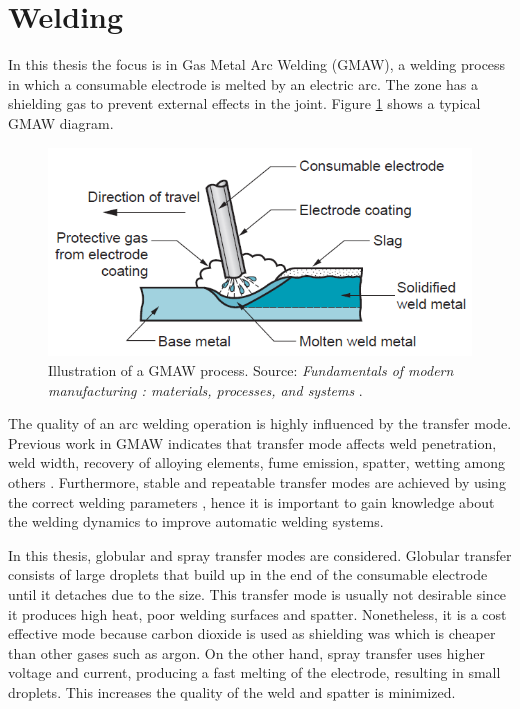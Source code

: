 \section{Welding}
In this thesis the focus is in Gas Metal Arc Welding (GMAW), a welding process in which a consumable electrode is melted by an electric arc. The zone has a shielding gas to prevent external effects in the joint. Figure \ref{fig:gmaw} shows a typical GMAW diagram.

\begin{figure}
    \centering
    \includegraphics{Images/Background/gmaw.png}
    \caption[Illustration of a GMAW process]{Illustration of a GMAW process. Source: \textit{Fundamentals of modern manufacturing : materials, processes, and systems} \cite{grover}.}
    \label{fig:gmaw}
\end{figure}

The quality of an arc welding operation is highly influenced by the transfer mode. Previous work in GMAW indicates that transfer mode affects weld penetration, weld width, recovery of alloying elements, fume emission, spatter, wetting among others \cite{lancaster, mendez2015}. Furthermore, stable and repeatable transfer modes are achieved by using the correct welding parameters \cite{zhang2}, hence it is important to gain knowledge about the welding dynamics to improve automatic welding systems.

In this thesis, globular and spray transfer modes are considered. Globular transfer consists of large droplets that build up in the end of the consumable electrode until it detaches due to the size. This transfer mode is usually not desirable since it produces high heat, poor welding surfaces and spatter. Nonetheless, it is a cost effective mode because carbon dioxide is used as shielding was which is cheaper than other gases such as argon. On the other hand, spray transfer uses higher voltage and current, producing a fast melting of the electrode, resulting in small droplets. This increases the quality of the weld and spatter is minimized.

